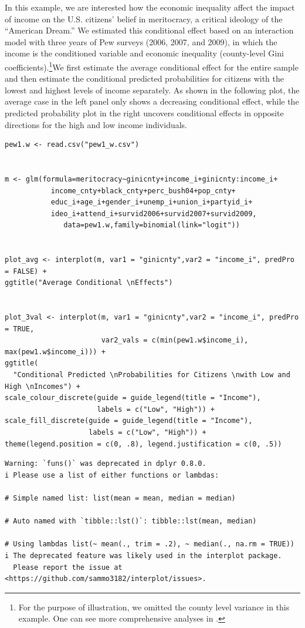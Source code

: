\documentclass[
  article]{jss}
\begin{document}
In this example, we are interested how the economic inequality affect
the impact of income on the U.S. citizens' belief in meritocracy, a
critical ideology of the ``American Dream.'' We estimated this
conditional effect based on an interaction model with three years of Pew
surveys (2006, 2007, and 2009), in which the income is the conditioned
variable and economic inequality (county-level Gini
coefficients).\footnote{For the purpose of illustration, we omitted the
  county level variance in this example. One can see more comprehensive
  analyses in \citep{solt2017}.}We first estimate the average
conditional effect for the entire sample and then estimate the
conditional predicted probabilities for citizens with the lowest and
highest levels of income separately. As shown in the following plot, the
average case in the left panel only shows a decreasing conditional
effect, while the predicted probability plot in the right uncovers
conditional effects in opposite directions for the high and low income
individuals.

\begin{verbatim}
pew1.w <- read.csv("pew1_w.csv")


m <- glm(formula=meritocracy~ginicnty+income_i+ginicnty:income_i+
           income_cnty+black_cnty+perc_bush04+pop_cnty+
           educ_i+age_i+gender_i+unemp_i+union_i+partyid_i+
           ideo_i+attend_i+survid2006+survid2007+survid2009,
              data=pew1.w,family=binomial(link="logit"))
 
              
plot_avg <- interplot(m, var1 = "ginicnty",var2 = "income_i", predPro = FALSE) + 
ggtitle("Average Conditional \nEffects")


plot_3val <- interplot(m, var1 = "ginicnty",var2 = "income_i", predPro = TRUE, 
                       var2_vals = c(min(pew1.w$income_i), max(pew1.w$income_i))) +
ggtitle(
  "Conditional Predicted \nProbabilities for Citizens \nwith Low and High \nIncomes") +
scale_colour_discrete(guide = guide_legend(title = "Income"), 
                      labels = c("Low", "High")) + 
scale_fill_discrete(guide = guide_legend(title = "Income"), 
                    labels = c("Low", "High")) +
theme(legend.position = c(0, .8), legend.justification = c(0, .5))
\end{verbatim}

\begin{verbatim}
Warning: `funs()` was deprecated in dplyr 0.8.0.
i Please use a list of either functions or lambdas:

# Simple named list: list(mean = mean, median = median)

# Auto named with `tibble::lst()`: tibble::lst(mean, median)

# Using lambdas list(~ mean(., trim = .2), ~ median(., na.rm = TRUE))
i The deprecated feature was likely used in the interplot package.
  Please report the issue at <https://github.com/sammo3182/interplot/issues>.
\end{verbatim}
\end{document}
